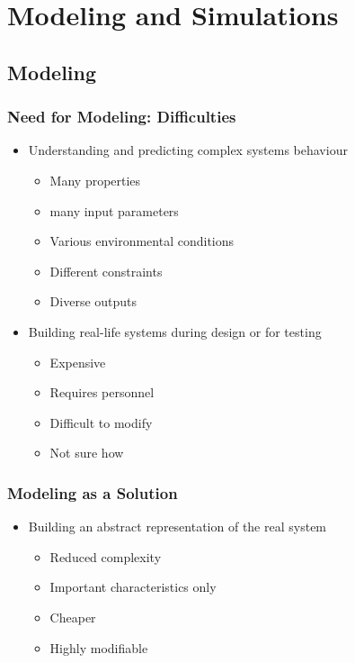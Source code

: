 \documentclass[a4paper]{article}
\begin{document}
	\section{Modeling and Simulations}
	\subsection{Modeling}
	\subsubsection{Need for Modeling: Difficulties}
	\begin{itemize}
		\item Understanding and predicting complex systems behaviour
		\begin{itemize}
			\item Many properties
			\item many input parameters
			\item Various environmental conditions
			\item Different constraints
			\item Diverse outputs
		\end{itemize}
		\item Building real-life systems during design or for testing
		\begin{itemize}
			\item Expensive
			\item Requires personnel
			\item Difficult to modify
			\item Not sure how
		\end{itemize}
	\end{itemize}

	\subsubsection{Modeling as a Solution}
	\begin{itemize}
		\item Building an abstract representation of the real system
		\begin{itemize}
			\item Reduced complexity
			\item Important characteristics only
			\item Cheaper
			\item Highly modifiable
		\end{itemize}
	\end{itemize}
	
\end{document}
